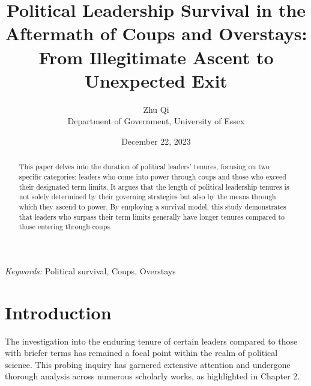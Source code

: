 \documentclass[
  12pt,
  a4paper,
  12pt]{article}
\begin{document}
\def\spacingset#1{\renewcommand{\baselinestretch}%
{#1}\small\normalsize} \spacingset{1}



\date{December 22, 2023}
\title{\bf Political Leadership Survival in the Aftermath of Coups and
Overstays: From Illegitimate Ascent to Unexpected Exit}
\author{
Zhu Qi\\
Department of Government, University of Essex\\
}
\maketitle

\bigskip
\bigskip
\begin{abstract}
This paper delves into the duration of political leaders' tenures,
focusing on two specific categories: leaders who come into power through
coups and those who exceed their designated term limits. It argues that
the length of political leadership tenures is not solely determined by
their governing strategies but also by the means through which they
ascend to power. By employing a survival model, this study demonstrates
that leaders who surpass their term limits generally have longer tenures
compared to those entering through coups.
\end{abstract}

\noindent%
{\it Keywords:} Political survival, Coups, Overstays
\vfill

\newpage
\spacingset{1.9} %
\ifdefined\Shaded\renewenvironment{Shaded}{\begin{tcolorbox}[interior hidden, borderline west={3pt}{0pt}{shadecolor}, sharp corners, frame hidden, enhanced, boxrule=0pt, breakable]}{\end{tcolorbox}}\fi

\hypertarget{introduction}{%
\section{Introduction}\label{introduction}}

The investigation into the enduring tenure of certain leaders compared
to those with briefer terms has remained a focal point within the realm
of political science. This probing inquiry has garnered extensive
attention and undergone thorough analysis across numerous scholarly
works, as highlighted in Chapter 2.
\end{document}
